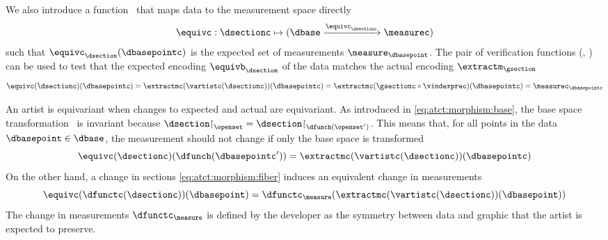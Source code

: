 \documentclass[10pt,journal,compsoc]{IEEEtran}
\renewcommand{\restriction}{\mathord{\upharpoonright}} %
\theoremstyle{definition}
\theoremstyle{remark}
\begin{document}
We also introduce a function \equivc\ that maps data to the measurement space directly 
\begin{equation}
\equivc: \dsectionc \mapsto (\dbase \xrightarrow{\equivc_{\dsectionc}} \measurec)
\end{equation}
such that $\equivc_{\dsection}(\dbasepointc)$ is the expected set of measurements $\measure_{\dbasepoint}$. The pair of \textcolor{monoid}{verification functions} (\equivc, \extractmc) can be used to test that the expected encoding $\equivb_{\dsection}$ of the data matches the actual encoding $\extractm_{\gsection}$ 
\begin{equation}
  \label{eq:artist:verification}
    \equivc(\dsectionc)(\dbasepointc) = \extractmc(\vartistc(\dsectionc))(\dbasepointc) = \extractmc(\gsectionc\circ\vindexprec)(\dbasepointc)=\measurec_{\dbasepointc}
\end{equation}

An artist is equivariant when changes to expected and actual are equivariant. As introduced in \autoref{eq:atct:morphism:base}, the base space transformation \dfunch\ is invariant because $\dsection\restriction_{\openset} = \dsection\restriction_{\dfunch(\openset^{\prime})}$. This means that, for all points in the data $\dbasepoint \in \dbase$, the measurement should not change if only the base space is transformed 
\begin{equation}
  \label{eq:atct:equivarance:verify:base}
  \equivc(\dsectionc)(\dfunch(\dbasepointc^{\prime})) = \extractmc(\vartistc(\dsectionc))(\dbasepointc)
\end{equation}
On the other hand, a change in sections \autoref{eq:atct:morphism:fiber} induces an equivalent change in measurements
\begin{equation}
  \label{eq:atct:equivarance:verify:fiber}
  \equivc(\dfunctc(\dsectionc))(\dbasepoint) = \dfunctc_{\measure}(\extractmc(\vartistc(\dsectionc))(\dbasepoint))
\end{equation}
The change in measurements $\dfunctc_{\measure}$ is defined by the developer as the symmetry between data and graphic that the artist is expected to preserve. 
\end{document}
